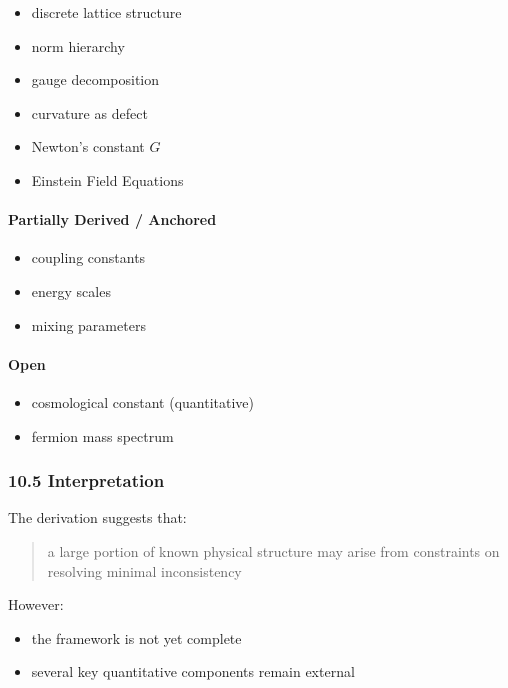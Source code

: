\documentclass[
]{article}
\providecommand{\tightlist}{%
  \setlength{\itemsep}{0pt}\setlength{\parskip}{0pt}}
\begin{document}
\begin{itemize}
\tightlist
\item
  discrete lattice structure
\item
  norm hierarchy
\item
  gauge decomposition
\item
  curvature as defect
\item
  Newton's constant \(G\)
\item
  Einstein Field Equations
\end{itemize}

\paragraph{Partially Derived /
Anchored}\label{partially-derived-anchored}

\begin{itemize}
\tightlist
\item
  coupling constants
\item
  energy scales
\item
  mixing parameters
\end{itemize}

\paragraph{Open}\label{open}

\begin{itemize}
\tightlist
\item
  cosmological constant (quantitative)
\item
  fermion mass spectrum
\end{itemize}

\subsubsection{10.5 Interpretation}\label{interpretation-1}

The derivation suggests that:

\begin{quote}
a large portion of known physical structure may arise from constraints
on resolving minimal inconsistency
\end{quote}

However:

\begin{itemize}
\tightlist
\item
  the framework is not yet complete
\item
  several key quantitative components remain external
\end{itemize}
\end{document}

